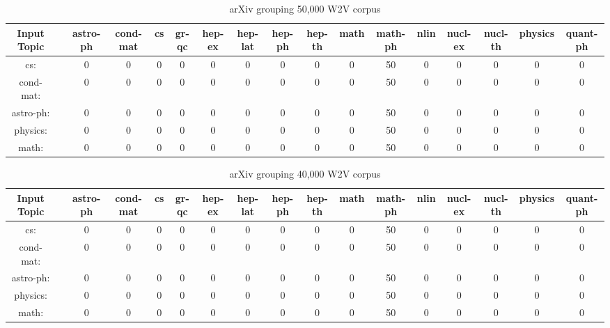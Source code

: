 \begin{sidewaystable}[h]
    \begin{tabular}{|c c c c c c c c c c c c c c c c c|}
         \hline
         Input Topic & & astro-ph & cond-mat & cs & gr-qc & hep-ex &hep-lat & hep-ph & hep-th & math & math-ph & nlin & nucl-ex & nucl-th & physics & quant-ph \\ [0.5ex]
         \hline\hline
         cs: & & 0 & 0 & 0 & 0 & 0 & 0 & 0 & 0 & 0 & 50 & 0 & 0 & 0 & 0 & 0 \\
         cond-mat: & & 0 & 0 & 0 & 0 & 0 & 0 & 0 & 0 & 0 & 50 & 0 & 0 & 0 & 0 & 0\\
         astro-ph: & & 0 & 0 & 0 & 0 & 0 & 0 & 0 & 0 & 0 & 50 & 0 & 0 & 0 & 0 & 0 \\
         physics: & & 0 & 0 & 0 & 0 & 0 & 0 & 0 & 0 & 0 & 50 & 0 & 0 & 0 & 0 & 0 \\
         math: & & 0 & 0 & 0 & 0 & 0 & 0 & 0 & 0 & 0 & 50 & 0 & 0 & 0 & 0 & 0 \\ [1ex]
         \hline
    \end{tabular}
    \caption{arXiv grouping 50,000 W2V corpus}
    \label{table:arxiv50000w2v}
\end{sidewaystable}

\begin{sidewaystable}[h]
    \begin{tabular}{|c c c c c c c c c c c c c c c c c|}
         \hline
         Input Topic & & astro-ph & cond-mat & cs & gr-qc & hep-ex &hep-lat & hep-ph & hep-th & math & math-ph & nlin & nucl-ex & nucl-th & physics & quant-ph \\ [0.5ex]
         \hline\hline
         cs: & & 0 & 0 & 0 & 0 & 0 & 0 & 0 & 0 & 0 & 50 & 0 & 0 & 0 & 0 & 0 \\
         cond-mat: & & 0 & 0 & 0 & 0 & 0 & 0 & 0 & 0 & 0 & 50 & 0 & 0 & 0 & 0 & 0\\
         astro-ph: & & 0 & 0 & 0 & 0 & 0 & 0 & 0 & 0 & 0 & 50 & 0 & 0 & 0 & 0 & 0 \\
         physics: & & 0 & 0 & 0 & 0 & 0 & 0 & 0 & 0 & 0 & 50 & 0 & 0 & 0 & 0 & 0 \\
         math: & & 0 & 0 & 0 & 0 & 0 & 0 & 0 & 0 & 0 & 50 & 0 & 0 & 0 & 0 & 0 \\ [1ex]
         \hline
    \end{tabular}
    \caption{arXiv grouping 40,000 W2V corpus}
    \label{table:arxiv40000w2v}
\end{sidewaystable}

